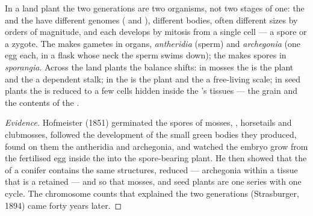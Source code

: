 \begin{proposition}\label{prop:b2:plant-life-cycles:alternation}
In a land plant the two generations are two organisms, not two
stages of one: the  and the  have different
genomes ( and ), different bodies, often different
sizes by orders of magnitude, and each develops by mitosis from a
single cell --- a spore or a zygote. The  makes gametes in
 organs, \emph{antheridia} (sperm) and \emph{archegonia}
(one egg each, in a flask whose neck the sperm swims down); the
 makes spores in \emph{sporangia}. Across the land plants
the balance shifts: in mosses the  is the plant and the
 a dependent stalk; in  the  is the plant
and the  a free-living scale; in seed plants the
 is reduced to a few cells hidden inside the 's
tissues --- the  grain and the contents of the .
\end{proposition}
\begin{proof}[Evidence]
Hofmeister (1851) germinated the spores of mosses, ,
horsetails and clubmosses, followed the development of the small
green bodies they produced, found on them the antheridia and
archegonia, and watched the embryo grow from the fertilised egg
inside the  into the spore-bearing plant. He then showed
that the  of a conifer contains the same structures, reduced
--- archegonia within a tissue that is a retained  --- and
so that mosses,  and seed plants are one series with one cycle.
The chromosome counts that explained the two generations (Strasburger,
1894) came forty years later.
\end{proof}

